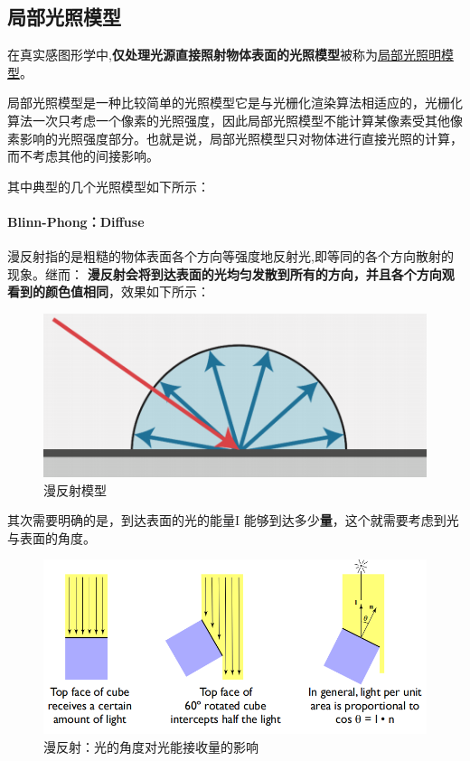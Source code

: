 \documentclass[UTF8,a4paper,12pt]{ctexbook}
\begin{document}
		\subsection{局部光照模型}
			在真实感图形学中,\textbf{仅处理光源直接照射物体表面的光照模型}被称为\underline{局部光照明模型}。
			
			局部光照模型是一种比较简单的光照模型它是与光栅化渲染算法相适应的，光栅化算法一次只考虑一个像素的光照强度，因此局部光照模型不能计算某像素受其他像素影响的光照强度部分。也就是说，局部光照模型只对物体进行直接光照的计算，而不考虑其他的间接影响。
			
			其中典型的几个光照模型如下所示：
			
			
			\paragraph{Blinn-Phong：Diffuse}
				漫反射指的是粗糙的物体表面各个方向等强度地反射光,即等同的各个方向散射的现象。继而：
				\textbf{漫反射会将到达表面的光均匀发散到所有的方向，并且各个方向观看到的颜色值相同}，效果如下所示：
				\begin{figure}[H]
					\centering
					\includegraphics[width=.5\linewidth]{DiffuseModel}
					\caption{漫反射模型}
				\end{figure}
				
				其次需要明确的是，到达表面的光的能量I 能够到达多少\textbf{量}，这个就需要考虑到光与表面的角度。
				\begin{figure}[H]
					\centering
					\includegraphics[width=\linewidth]{DiffuseModel02}
					\caption{漫反射：光的角度对光能接收量的影响}
				\end{figure}				
				
\end{document}
